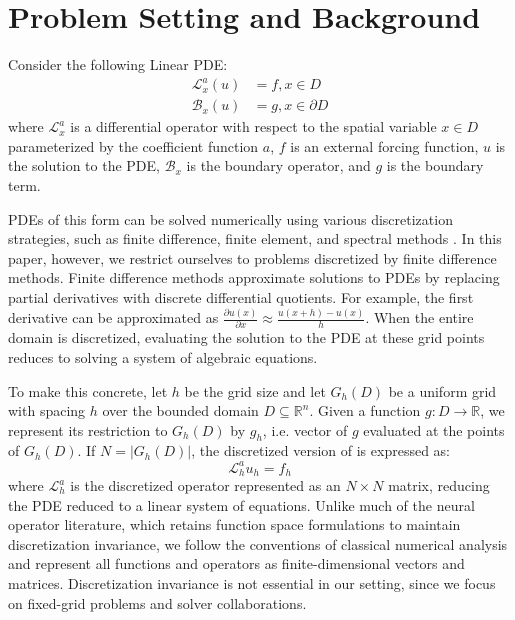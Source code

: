 \documentclass{article} %
\begin{document}
\section{Problem Setting and Background} \label{sec:background}

Consider the following Linear PDE:
\begin{equation} \label{eq:mainpde}
    \begin{split}
    \mathcal{L}_{x}^a\left(u\right) &= f ,x \in D \\
    \mathcal{B}_{x}\left(u\right) &= g ,x \in \partial D
    \end{split}
\end{equation}
where $\mathcal{L}_x^a$ is a differential operator with respect to the spatial variable $x \in D$ parameterized by the coefficient function $a$,  $f$ is an external forcing function,  $u$ is the solution to the PDE, $\mathcal{B}_{x}$ is the boundary operator, and $g$ is the boundary term.  

PDEs of this form can be solved numerically using various discretization strategies, such as finite difference, finite element, and spectral methods \citep{boyd2001chebyshev,canuto2006spectral}. In this paper, however, we restrict ourselves to problems discretized by finite difference methods. Finite difference methods \citep{smith1985numerical,leveque2007finite} approximate solutions to PDEs by replacing partial derivatives with discrete differential quotients. For example, the first derivative can be approximated as $\frac{\partial u(x)}{\partial x} \approx \frac{u(x + h) - u(x)}{h}$. When the entire domain is discretized,  evaluating the solution to the PDE at these grid points reduces to solving a system of algebraic equations.

To make this concrete, let $h$ be the grid size and let $G_h(D)$ be a uniform grid with spacing $h$ over the bounded domain $D \subseteq \mathbb{R}^n$. Given a function $g: D \to \mathbb{R}$, we represent its restriction to $G_h(D)$ by $g_h$, i.e. vector of $g$ evaluated at the points of $G_h(D)$.
If $N = |G_h(D)|$, the discretized version of  is expressed as:
\begin{equation} \label{eq:mainpdediscrete}
    \mathcal{L}_h^au_h = f_h
\end{equation}
where $\mathcal{L}_h^a$ is the discretized operator represented as an $N \times N$ matrix, reducing the PDE reduced to a linear system of equations. Unlike much of the neural operator literature, which retains function space formulations to maintain discretization invariance, we follow the conventions of classical numerical analysis and represent all functions and operators as finite-dimensional vectors and matrices. Discretization invariance is not essential in our setting, since we focus on fixed-grid problems and solver collaborations.
\end{document}
